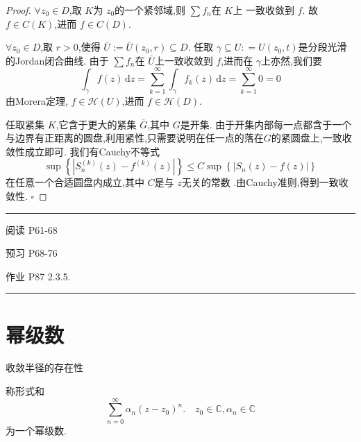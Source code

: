 \documentclass[../../复变函数.tex]{subfiles}
\begin{document}
\begin{proof}
    \(  \forall z_0 \in D  \),取 \(  K  \)为 \(  z_0  \)的一个紧邻域,则 \(  \sum f_{n}  \)在 \(  K  \)上 一致收敛到 \(  f  \).     
    故 \(  f \in C\left( K \right)   \),进而 \(  f \in C\left( D \right)   \).
    
    \(  \forall z_0 \in D  \),取 \(  r> 0  \),使得 \(  \overline{U}:= \overline{U}\left( z_0,r \right)\subseteq D   \).   任取 \(   \gamma \subseteq U: =  U\left( z_0,t \right)   \)是分段光滑的Jordan闭合曲线.
    由于 \(  \sum f_{n}  \)在 \(  \overline{U}  \)上一致收敛到 \(  f  \),进而在 \(   \gamma   \)上亦然,我们要 \[
    \int_{ \gamma }f\left( z \right)\,\mathrm{d} z= \sum _{k= 1}^{\infty}\int_{ \gamma }f_{k}\left( z \right)\,\mathrm{d} z=\sum _{k= 1}^{\infty}0= 0  
    \]由Morera定理, \(  f \in \mathcal{H}\left( U \right)   \),进而 \(  f \in \mathcal{H}\left( D \right)   \).    

    任取紧集 \(  K  \),它含于更大的紧集 \(  \overline{G}  \),其中 \(  G  \)是开集.  由于开集内部每一点都含于一个与边界有正距离的圆盘,利用紧性,只需要说明在任一点的落在\(  G\)的紧圆盘上,一致收敛性成立即可.  
    我们有Cauchy不等式 \[
    \sup \left\{ \left| S_{n}^{\left( k \right) }\left( z \right)-f^{\left( k \right) }\left( z \right)   \right|  \right\}\le C \sup \left\{ \left| S_{n}\left( z \right)  -f\left( z \right) \right|  \right\}
    \]在任意一个合适圆盘内成立,其中 \(  C  \)是与 \(  z  \)无关的常数  .由Cauchy准则,得到一致收敛性.
    \hfill $\square$
\end{proof}


\hspace*{\fill} 
\hrule
\hspace*{\fill}

阅读 P61-68

预习 P68-76

作业 P87 2.3.5.


\hspace*{\fill} 
\hrule
\hspace*{\fill}



\section{幂级数}

\begin{introduction}
    \item 收敛半径的存在性  
\end{introduction}

\begin{definition}
    称形式和 \[
    \sum _{n =  0}^{\infty}  \alpha _{n}\left( z-z_0 \right)^{n}.\quad z_0 \in \mathbb{C} , \alpha _{n}\in \mathbb{C} \tag{*} 
    \]为一个幂级数.
\end{definition}
\end{document}
